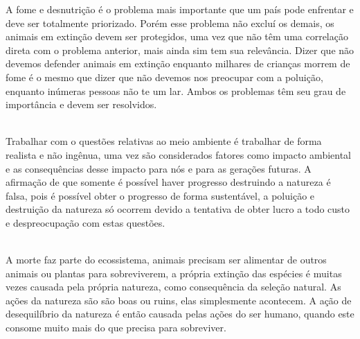 \documentclass[a4paper, 12pt]{article}
\begin{document}
    \par A fome e desnutrição é o problema mais importante que um país pode enfrentar e deve ser totalmente priorizado. Porém esse problema não excluí os demais, os animais em extinção devem ser protegidos, uma vez que não têm uma correlação direta com o problema anterior, mais ainda sim tem sua relevância. Dizer que não devemos defender animais em extinção enquanto milhares de crianças morrem de fome é o mesmo que dizer que não devemos nos preocupar com a poluição, enquanto inúmeras pessoas não te um lar. Ambos os problemas têm seu grau de importância e devem ser resolvidos. \\

    \noindent{} \\
    
    \par Trabalhar com o questões relativas ao meio ambiente é trabalhar de forma realista e não ingênua, uma vez são considerados fatores como impacto ambiental e as consequências desse impacto para nós e para as gerações futuras. A afirmação de que somente é possível haver  progresso destruindo a natureza é falsa, pois é possível obter o progresso de forma sustentável, a poluição e destruição da natureza só ocorrem devido a tentativa de obter lucro a todo custo e despreocupação com estas questões. \\

    \noindent{} \\

    \par A morte faz parte do ecossistema, animais precisam ser alimentar de outros animais ou plantas para sobreviverem, a própria extinção das espécies é muitas vezes causada pela própria natureza, como consequência da seleção natural. As ações da natureza são são boas ou ruins, elas simplesmente acontecem. A ação de desequilíbrio da natureza é então causada pelas ações do ser humano, quando este consome muito mais do que precisa para sobreviver.
\end{document}
